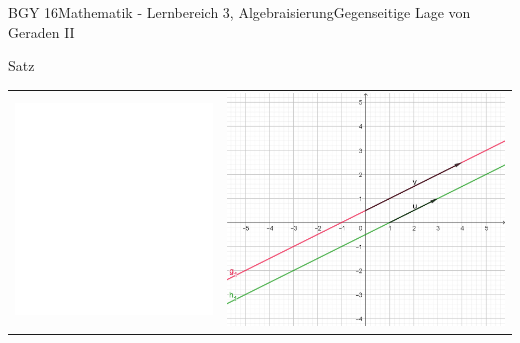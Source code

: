 \documentclass[oneside,openany,headings=optiontotoc,11pt,numbers=noenddot]{scrreprt}
\begin{document}
\begin{worksheet}{BGY 16}{Mathematik - Lernbereich 3, Algebraisierung}{Gegenseitige Lage von Geraden II}
\begin{framed}
		\end{framed}
		\begin{framed}
			\tiny{\color{codegray}Satz}
			\noindent
			\begin{center}
				\begin{tabularx}{\textwidth}{Xr}
					\includegraphics[scale=0.29]{../empty.jpg} & \includegraphics[scale=0.29]{Bilder/ghParallel.jpg}\\

\end{tabularx}
\end{center}
\end{framed}
\end{worksheet}
\end{document}
